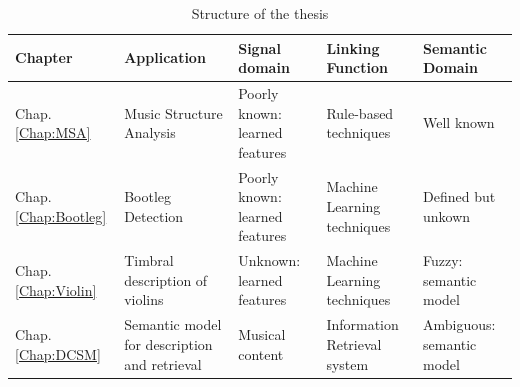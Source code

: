 \begin{table}[tbp]
\centering
\caption{Structure of the thesis}
\label{tab:intro:chapters}
  \bgroup
  \def\arraystretch{1.5}
\begin{tabular}{||l|>{\RaggedRight}p{2.2cm} |>{\RaggedRight}p{3cm} >{\RaggedRight}p{3cm} >{\RaggedRight}p{2.8cm}||}
\hline
\hline
\textbf{Chapter}  &\textbf{Application}& \textbf{Signal domain} & \textbf{Linking Function} & \textbf{Semantic Domain} \\
\hline
\hline
Chap. \ref{Chap:MSA} & Music \newline Structure Analysis & Poorly known: learned features & Rule-based \newline techniques &  Well known \\
\hline
Chap. \ref{Chap:Bootleg} & Bootleg \newline Detection &  Poorly known: learned features    &  Machine Learning techniques  & Defined but \newline unkown \\
\hline
Chap. \ref{Chap:Violin} & Timbral \newline description of violins & Unknown: learned features    & Machine Learning techniques  & Fuzzy: \newline semantic model \\
\hline
Chap. \ref{Chap:DCSM} & Semantic model for description and retrieval & Musical content  & Information \newline Retrieval system  &  Ambiguous: \newline semantic model\\
\hline
\hline
\end{tabular}
\egroup
\end{table}

%
%
